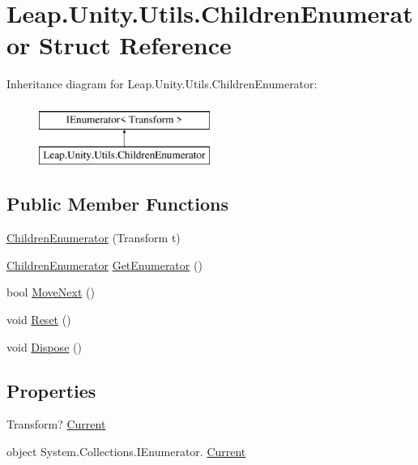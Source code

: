 \hypertarget{struct_leap_1_1_unity_1_1_utils_1_1_children_enumerator}{}\section{Leap.\+Unity.\+Utils.\+Children\+Enumerator Struct Reference}
\label{struct_leap_1_1_unity_1_1_utils_1_1_children_enumerator}
Inheritance diagram for Leap.\+Unity.\+Utils.\+Children\+Enumerator\+:\begin{figure}[H]
\begin{center}
\leavevmode
\includegraphics[height=2.000000cm]{struct_leap_1_1_unity_1_1_utils_1_1_children_enumerator}
\end{center}
\end{figure}
\subsection*{Public Member Functions}
\begin{DoxyCompactItemize}
\item 
\mbox{\hyperlink{struct_leap_1_1_unity_1_1_utils_1_1_children_enumerator_ad3bf2e5f6ba1faf2762a1a109cc44d0a}{Children\+Enumerator}} (Transform t)
\item 
\mbox{\hyperlink{struct_leap_1_1_unity_1_1_utils_1_1_children_enumerator}{Children\+Enumerator}} \mbox{\hyperlink{struct_leap_1_1_unity_1_1_utils_1_1_children_enumerator_a3f4ece6621b38b625ca87fc7f19f6c8d}{Get\+Enumerator}} ()
\item 
bool \mbox{\hyperlink{struct_leap_1_1_unity_1_1_utils_1_1_children_enumerator_a12e2f65f8c2cd04df418fcd7d05b9758}{Move\+Next}} ()
\item 
void \mbox{\hyperlink{struct_leap_1_1_unity_1_1_utils_1_1_children_enumerator_a4ba9a25338b9c3611cb6a4480f2d1073}{Reset}} ()
\item 
void \mbox{\hyperlink{struct_leap_1_1_unity_1_1_utils_1_1_children_enumerator_a52710b9027e8afc53f63b3f0302303a8}{Dispose}} ()
\end{DoxyCompactItemize}
\subsection*{Properties}
\begin{DoxyCompactItemize}
\item 
Transform? \mbox{\hyperlink{struct_leap_1_1_unity_1_1_utils_1_1_children_enumerator_a68c62e8621daa51abec5138c359c2534}{Current}}
\item 
object System.\+Collections.\+I\+Enumerator. \mbox{\hyperlink{struct_leap_1_1_unity_1_1_utils_1_1_children_enumerator_a831a35b2ce2e021c05df7af0d66cac80}{Current}}
\end{DoxyCompactItemize}


